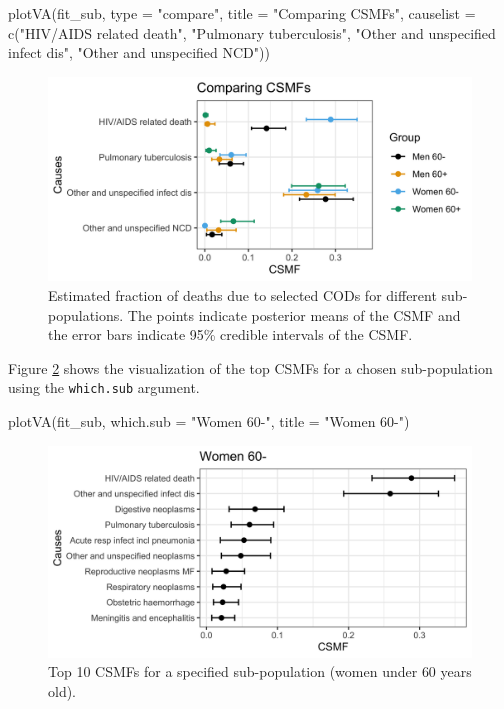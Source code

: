 \begin{Schunk}
\begin{Sinput}
plotVA(fit_sub, type = "compare", title = "Comparing CSMFs",
                causelist = c("HIV/AIDS related death", 
                              "Pulmonary tuberculosis", 
                              "Other and unspecified infect dis", 
                              "Other and unspecified NCD"))
\end{Sinput}
\begin{figure}[!h]

{\centering \includegraphics[width=0.8\linewidth,]{openVA-RJ-R1_files/figure-latex/ins4-1} 

}

\caption[ Estimated fraction of deaths due to selected CODs for different sub-populations]{ Estimated fraction of deaths due to selected CODs for different sub-populations. The points indicate posterior means of the CSMF and the error bars indicate 95\% credible intervals of the CSMF.}\label{fig:ins4}
\end{figure}
\end{Schunk}

Figure \ref{fig:ins5} shows the visualization of the top CSMFs for a
chosen sub-population using the \texttt{which.sub} argument.

\begin{Schunk}
\begin{Sinput}
plotVA(fit_sub, which.sub = "Women 60-", title = "Women 60-")
\end{Sinput}
\begin{figure}[!h]

{\centering \includegraphics[width=0.8\linewidth,]{openVA-RJ-R1_files/figure-latex/ins5-1} 

}

\caption[Top 10 CSMFs for a specified sub-population (women under $60$ years old)]{Top 10 CSMFs for a specified sub-population (women under $60$ years old).}\label{fig:ins5}
\end{figure}
\end{Schunk}

